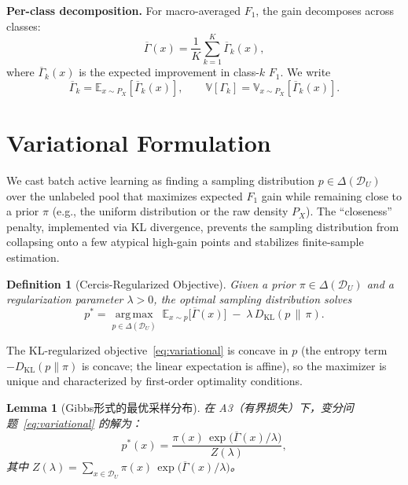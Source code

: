 \documentclass[12pt,a4paper]{article}
\newtheorem{lemma}[theorem]{Lemma}
\newtheorem{definition}[theorem]{Definition}
\newcommand{\E}{\mathbb{E}}
\newcommand{\V}{\mathbb{V}}
\newcommand{\cD}{\mathcal{D}}
\newcommand{\argmax}{\operatorname*{arg\,max}}
\newcommand{\KL}{D_{\mathrm{KL}}}
\begin{document}
\medskip\noindent
\textbf{Per-class decomposition.}
For macro-averaged $F_1$, the gain decomposes across classes:
\begin{equation}\label{eq:decomp}
    \overline{\Gamma}(x) =
    \frac{1}{K}\sum_{k=1}^{K} \overline{\Gamma}_k(x),
\end{equation}
where $\overline{\Gamma}_k(x)$ is the expected improvement in class-$k$
$F_1$.  We write
\begin{equation}\label{eq:class-gain-moments}
    \overline{\Gamma}_k = \E_{x\sim P_X}[\overline{\Gamma}_k(x)],\qquad
    \V[\Gamma_k] = \V_{x\sim P_X}[\overline{\Gamma}_k(x)].
\end{equation}

\section{Variational Formulation}

We cast batch active learning as finding a sampling distribution
$p\in\Delta(\cD_U)$ over the unlabeled pool that maximizes expected $F_1$
gain while remaining close to a prior $\pi$ (e.g., the uniform distribution
or the raw density $P_X$).  The ``closeness'' penalty, implemented via KL
divergence, prevents the sampling distribution from collapsing onto a few
atypical high-gain points and stabilizes finite-sample estimation.

\begin{definition}[Cercis-Regularized Objective]
\label{def:objective}
Given a prior $\pi\in\Delta(\cD_U)$ and a regularization parameter
$\lambda>0$, the optimal sampling distribution solves
\begin{equation}\label{eq:variational}
    p^* = \argmax_{p\in\Delta(\cD_U)}\;
    \E_{x\sim p}\big[\overline{\Gamma}(x)\big]
    \;-\; \lambda\,\KL(p\,\|\,\pi).
\end{equation}
\end{definition}

The KL-regularized objective~\eqref{eq:variational} is concave in $p$ (the
entropy term $-\KL(p\|\pi)$ is concave; the linear expectation is
affine), so the maximizer is unique and characterized by first-order
optimality conditions.

\begin{lemma}[Gibbs形式的最优采样分布]
\label{lem:gibbs}
在 A3（有界损失）下，变分问题~\eqref{eq:variational} 的解为：
\begin{equation}\label{eq:gibbs-sol}
    p^*(x) = \frac{\pi(x)\,\exp\!\big(\overline{\Gamma}(x)/\lambda\big)}
                  {Z(\lambda)},
\end{equation}
其中 $Z(\lambda)=\sum_{x\in\cD_U}\pi(x)\,
\exp\big(\overline{\Gamma}(x)/\lambda\big)$。
\end{lemma}
\end{document}

